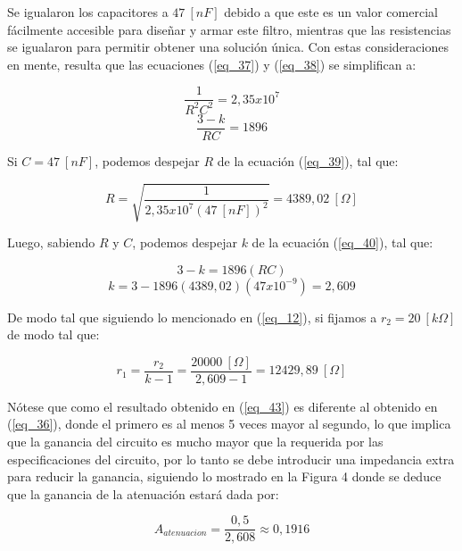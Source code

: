 \documentclass[12pt,a4paper]{article}
\begin{document}
Se igualaron los capacitores a $47 \ [nF]$ debido a que este es un valor comercial fácilmente accesible para diseñar y armar este filtro, mientras que las resistencias se igualaron para permitir obtener una solución única. Con estas consideraciones en mente, resulta que las ecuaciones (\ref{eq_37}) y (\ref{eq_38}) se simplifican a:

\begin{equation}
    \label{eq_39}
    \frac{1}{R^{2}C^{2}} = 2,35x10^{7}
\end{equation}
\begin{equation}
    \label{eq_40}
    \frac{3-k}{RC} = 1896
\end{equation}

Si $C = 47 \ [nF]$, podemos despejar $R$ de la ecuación (\ref{eq_39}), tal que:

\begin{equation}
    \label{eq_41}
    R = \sqrt{\frac{1}{2,35x10^{7} (47 \ [nF])^2}} = 4389,02 \ [\Omega]
\end{equation}

Luego, sabiendo $R$ y $C$, podemos despejar $k$ de la ecuación (\ref{eq_40}), tal que:

\begin{equation}
    \label{eq_42}
    3 - k = 1896(RC)
\end{equation}
\begin{equation}
    \label{eq_43}
    k = 3 - 1896(4389,02)(47x10^{-9}) = 2,609
\end{equation}

De modo tal que siguiendo lo mencionado en (\ref{eq_12}), si fijamos a $r_2 = 20 \ [k \Omega]$ de modo tal que:

\begin{equation}
    \label{eq_44}
    r_1 = \frac{r_2}{k-1} = \frac{20000 \ [\Omega]}{2,609 - 1} = 12429,89\ [\Omega]
\end{equation}

Nótese que como el resultado obtenido en (\ref{eq_43}) es diferente al obtenido en (\ref{eq_36}), donde el primero es al menos 5 veces mayor al segundo, lo que implica que la ganancia del circuito es mucho mayor que la requerida por las especificaciones del circuito, por lo tanto se debe introducir una impedancia extra para reducir la ganancia, siguiendo lo mostrado en la Figura 4 donde se deduce que la ganancia de la atenuación estará dada por:

\begin{equation}
    \label{eq_45}
    A_{atenuacion} = \frac{0,5}{2,608} \approx 0,1916
\end{equation}
\end{document}
